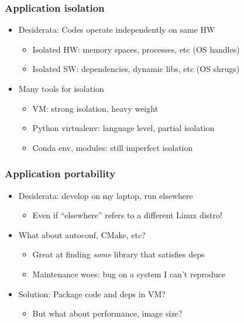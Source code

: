 \documentclass{beamer}
\begin{document}
\begin{frame}
  \frametitle{Application isolation}

  \begin{itemize}
  \item Desiderata: Codes operate independently on same HW
    \begin{itemize}
    \item Isolated HW: memory spaces, processes, etc (OS handles)
    \item Isolated SW: dependencies, dynamic libs, etc (OS shrugs)
    \end{itemize}
  \item Many tools for isolation
    \begin{itemize}
    \item VM: strong isolation, heavy weight
    \item Python virtualenv: language level, partial isolation
    \item Conda env, modules: still imperfect isolation
    \end{itemize}
  \end{itemize}
\end{frame}


\begin{frame}
  \frametitle{Application portability}

  \begin{itemize}
  \item Desiderata: develop on my laptop, run elsewhere
    \begin{itemize}
    \item Even if ``elsewhere'' refers to a different Linux distro!
    \end{itemize}
  \item What about autoconf, CMake, etc?
    \begin{itemize}
    \item Great at finding {\em some} library that satisfies deps
    \item Maintenance woes: bug on a system I can't reproduce
    \end{itemize}
  \item Solution: Package code and deps in VM?
    \begin{itemize}
    \item But what about performance, image size?
    \end{itemize}
  \end{itemize}
\end{frame}
\end{document}
